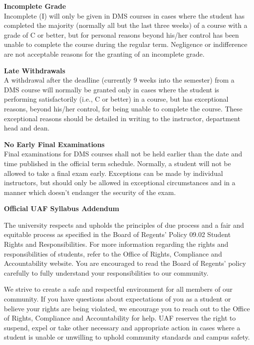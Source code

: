 \documentclass[12pt]{article}
\renewcommand{\emph}[1]{\textsf{\textbf{#1}}}
\newcommand{\localhead}[1]{\par\smallskip\textbf{#1}\nobreak\\}%
\def\subheading#1{\localhead{\emph{#1}}}
\begin{document}
\subheading{Incomplete Grade} 
Incomplete (I) will only be given in
  DMS courses in cases where
  the student has completed the majority (normally all but the last
  three weeks) of a course with a grade of C or better, but for
  personal reasons beyond his/her control has been unable to complete
  the course during the regular term. Negligence or indifference are
  not acceptable reasons for the granting of an incomplete
  grade. 

\subheading{Late Withdrawals} 
A withdrawal after the deadline
  (currently 9 weeks into the semester) from a DMS course will
  normally be granted only in cases where the student is performing
  satisfactorily (i.e., C or better) in a course, but has exceptional
  reasons, beyond his/her control, for being unable to complete the
  course. These exceptional reasons should be detailed in writing to
  the instructor, department head and dean.

\subheading{No Early Final Examinations}
Final examinations for DMS
  courses shall not be held earlier than the date and time published
  in the official term schedule. Normally, a student will not be
  allowed to take a final exam early. Exceptions can be made by
  individual instructors, but should only be allowed in exceptional
  circumstances and in a manner which doesn't endanger the security of
  the exam.

\begin{center}
\textbf{\large{Official UAF Syllabus Addendum}}
\end{center}


 The university respects and upholds the principles of due process and a fair and equitable process as specified in the Board of Regents' Policy 09.02 Student Rights and Responsibilities. For more information regarding the rights and responsibilities of students, refer to the Office of Rights, Compliance and Accountability website. You are encouraged to read the Board of Regents' policy carefully to fully understand your responsibilities to our community.

We strive to create a safe and respectful environment for all members of our community. If you have questions about expectations of you as a student or believe your rights are being violated, we encourage you to reach out to the  Office of Rights, Compliance and Accountability for help. UAF reserves the right to suspend, expel or take other necessary and appropriate action in cases where a student is unable or unwilling to uphold community standards and campus safety.
\end{document}
